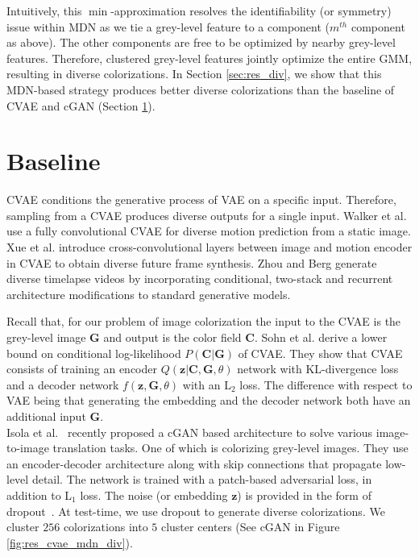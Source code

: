 \documentclass[10pt,twocolumn,letterpaper]{article}
\begin{document}
Intuitively, this $\min$-approximation resolves the identifiability (or symmetry) issue within 
MDN as we tie a grey-level feature to a component ($m^{th}$ component as above). The other components are
free to be optimized by nearby grey-level features. Therefore, clustered
grey-level features jointly optimize the entire GMM, resulting in diverse 
colorizations. In Section \ref{sec:res_div}, we show that this MDN-based strategy 
produces better diverse colorizations than the baseline of CVAE and cGAN
(Section \ref{sec:baseline}). 

\section{Baseline}\label{sec:baseline} CVAE 
conditions the generative process of VAE on a specific input. 
Therefore, sampling from a CVAE produces diverse outputs for a single 
input. Walker et al. \cite{Walker} use a fully convolutional CVAE for 
diverse motion prediction from a static image. Xue et 
al. \cite{CrossConv} introduce cross-convolutional layers between 
image and motion encoder in CVAE to obtain diverse future frame
synthesis. Zhou and Berg \cite{TLBerg} generate diverse timelapse
videos by incorporating conditional, two-stack and 
recurrent architecture modifications to standard generative models.

Recall that, for our problem of image colorization the input to the CVAE is the 
grey-level image $\mathbf{G}$ and output is the color field $\mathbf{C}$. 
Sohn et al. \cite{Sohn} derive a lower bound on conditional 
log-likelihood $P(\mathbf{C}|\mathbf{G})$ of CVAE. They show that 
CVAE consists of training an encoder $Q(\mathbf{z}|\mathbf{C},\mathbf{G}, \theta)$ 
network with KL-divergence loss and a decoder network $f(\mathbf{z}, \mathbf{G}, \theta)$ with 
an L$_2$ loss. The difference with respect to VAE being that generating the 
embedding and the decoder network both have an additional input $\mathbf{G}$. \\ 

 Isola et al.~\cite{Isola} recently
proposed a cGAN based architecture to solve various image-to-image translation tasks.
One of which is colorizing grey-level images. They use an encoder-decoder architecture
along with skip connections that propagate low-level detail. The network is trained
with a patch-based adversarial loss, in addition to L$_{1}$ loss. The noise 
(or embedding $\mathbf{z}$) is provided in the form of dropout~\cite{Srivastava}. 
At test-time, we use dropout to generate diverse colorizations. We cluster
$256$ colorizations into $5$ cluster centers (See cGAN in 
Figure \ref{fig:res_cvae_mdn_div}). \\
\end{document}
